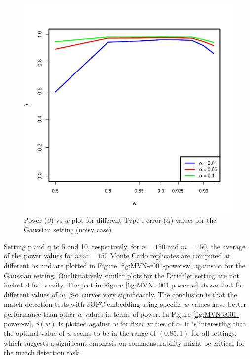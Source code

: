 \documentclass[11pt]{article} %
\begin{document}
\begin{figure}
\includegraphics[scale=0.95]{OOSDirichlet-power-w-c0-01.pdf}
\caption{Power ($\beta$) vs $w$ plot for different Type I error ($\alpha$) values for the Gaussian setting (noisy case)}
\label{fig:Dir-c001-power-w}
\end{figure}

Setting p and q to 5 and 10, respectively, for $n=150$ and $m=150$, the average of the power values for $nmc=150$ Monte Carlo replicates are computed at  different $\alpha$s and are plotted in Figure \ref{fig:MVN-c001-power-w} against $\alpha$ for the Gaussian setting.  Qualititatively similar plots for the Dirichlet setting  are not included for brevity.  The plot in Figure \ref{fig:MVN-c001-power-w} shows that for different values of  $w$, $\beta$-$\alpha$ curves vary significantly.  The conclusion is that the match detection tests with JOFC embedding using specific $w$ values have better performance than other $w$ values in terms of power.  In Figure
 \ref{fig:MVN-c001-power-w},  $\beta(w)$ is plotted against $w$ for fixed values of $\alpha$. It is  interesting that the optimal value of $w$ seems to be in the range of $(0.85,1)$ for all settings, which suggests a significant emphasis on commensurability might be  critical for the match detection  task. 
\end{document}
